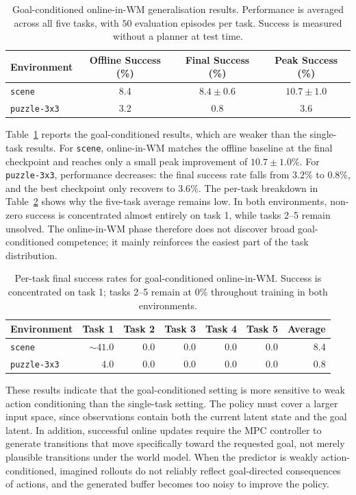 \begin{table}[h]
\centering
\caption{Goal-conditioned online-in-WM generalisation results.
Performance is averaged across all five tasks, with $50$ evaluation
episodes per task. Success is measured without a planner at test time.}
\label{tab:gen-goal-conditioned}
\begin{tabular}{lccc}
\toprule
Environment & Offline Success (\%) & Final Success (\%) & Peak Success (\%) \\
\midrule
\texttt{scene} & 8.4 & $8.4 \pm 0.6$ & $10.7 \pm 1.0$ \\
\texttt{puzzle-3x3} & 3.2 & 0.8 & 3.6 \\
\bottomrule
\end{tabular}
\end{table}

Table~\ref{tab:gen-goal-conditioned} reports the goal-conditioned results,
which are weaker than the single-task results.
For \texttt{scene}, online-in-WM matches the offline baseline at the
final checkpoint and reaches only a small peak improvement of
$10.7 \pm 1.0\%$. For \texttt{puzzle-3x3}, performance decreases:
the final success rate falls from $3.2\%$ to $0.8\%$, and the best
checkpoint only recovers to $3.6\%$.
The per-task breakdown in Table~\ref{tab:gen-goal-conditioned-tasks}
shows why the five-task average remains low. In both environments,
non-zero success is concentrated almost entirely on task 1, while tasks
2--5 remain unsolved. The online-in-WM phase therefore does not
discover broad goal-conditioned competence; it mainly reinforces the
easiest part of the task distribution.

\begin{table}[h]
\centering
\caption{Per-task final success rates for goal-conditioned
online-in-WM. Success is concentrated on task 1; tasks 2--5 remain at
$0\%$ throughout training in both environments.}
\label{tab:gen-goal-conditioned-tasks}
\begin{tabular}{lrrrrrr}
\toprule
Environment & Task 1 & Task 2 & Task 3 & Task 4 & Task 5 & Average \\
\midrule
\texttt{scene} & $\sim 41.0$ & 0.0 & 0.0 & 0.0 & 0.0 & 8.4 \\
\texttt{puzzle-3x3} & 4.0 & 0.0 & 0.0 & 0.0 & 0.0 & 0.8 \\
\bottomrule
\end{tabular}
\end{table}

These results indicate that the goal-conditioned setting is more
sensitive to weak action conditioning than the single-task setting. The
policy must cover a larger input space, since observations contain both
the current latent state and the goal latent. In addition, successful
online updates require the MPC controller to generate transitions that
move specifically toward the requested goal, not merely plausible
transitions under the world model. When the predictor is weakly
action-conditioned, imagined rollouts do not reliably reflect
goal-directed consequences of actions, and the generated buffer becomes
too noisy to improve the policy.

